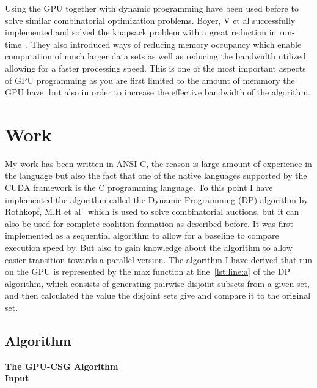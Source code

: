 \documentclass[a4paper, 12pt]{report}
\begin{document}
Using the GPU together with dynamic programming have been used before to solve similar combinatorial optimization problems.
Boyer, V et al successfully implemented and solved the knapsack problem with a great reduction in run-time~\cite{boyer2012solving}.
They also introduced ways of reducing memory occupancy which enable computation of much larger data sets as well as reducing the bandwidth utilized allowing for a faster processing speed.
This is one of the most important aspects of GPU programming as you are first limited to the amount of memmory the GPU have, but also in order to increase the effective bandwidth of the algorithm.





\section{Work}
My work has been written in ANSI C, the reason is large amount of experience in the language but also the fact that one of the native languages supported by the CUDA framework is the C programming language.
To this point I have implemented the algorithm called the Dynamic Programming (DP) algorithm by Rothkopf, 
M.H et al~\cite{rothkopf1998computationally} which is used to solve combinatorial auctions, but it can also be used for complete coalition formation as described before.
It was first implemented as a sequential algorithm to allow for a baseline to compare execution speed by.
But also to gain knowledge about the algorithm to allow easier transition towards a parallel version.
The algorithm I have derived that run on the GPU is represented by the max function at line~\ref{lst:line:a} of the DP algorithm, 
which consists of generating pairwise disjoint subsets from a given set, and then calculated the value the disjoint sets give and compare it to the original set. 

\thispagestyle{empty}

\thispagestyle{empty}
\pagestyle{empty}
\subsection{Algorithm}

\textbf{The GPU-CSG Algorithm\label{gpudp}} \\

\textbf{Input}
\end{document}

